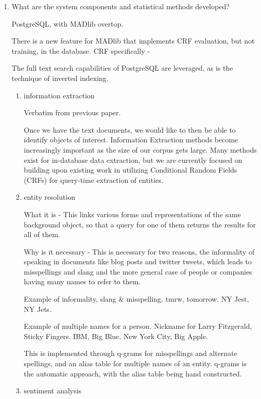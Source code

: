 \documentclass{article}
\begin{document}
\begin{enumerate}
\begin{enumerate}
  \item What are the system components and statistical methods developed?

    PostgreSQL, with MADlib overtop.

    There is a new feature for MADlib that implements CRF evaluation, but not training, in the database.
    CRF specifically -

    The full text search capabilities of PostgreSQL are leveraged,
    as is the technique of inverted indexing.

    

    \begin{enumerate}
    \item information extraction

      Verbatim from previous paper.

      Once we have the text documents, we would like to then be able to identify
      objects of interest. Information Extraction methods become increasingly
      important as the size of our corpus gets large. Many methods exist for in-database data
      extraction, but we are currently focused on building upon existing work in
      utilizing Conditional Random Fields (CRFs) for query-time extraction of
      entities.

    \item entity resolution

      What it is -
      This links various forms and representations of the same background object,
      so that a query for one of them returns the results for all of them.

      Why is it necessary -
      This is necessary for two reasons,
      the informality of speaking in documents like blog posts and twitter tweets,
      which leads to misspellings and slang
      and the more  general case of people or companies having many names to refer to them.

      Example of informality, slang \& misspelling. tmrw, tomorrow. NY Jest, NY Jets.

      Example of multiple names for a person. Nickname for Larry Fitzgerald, Sticky Fingers. IBM, Big Blue. New York City, Big Apple.

      This is implemented through q-grams for misspellings and alternate spellings,
      and an alias table for multiple names of an entity.
      q-grams is the automatic approach,
      with the alias table being hand constructed.

    \item sentiment analysis


\end{enumerate}
\end{enumerate}
\end{enumerate}
\end{document}
